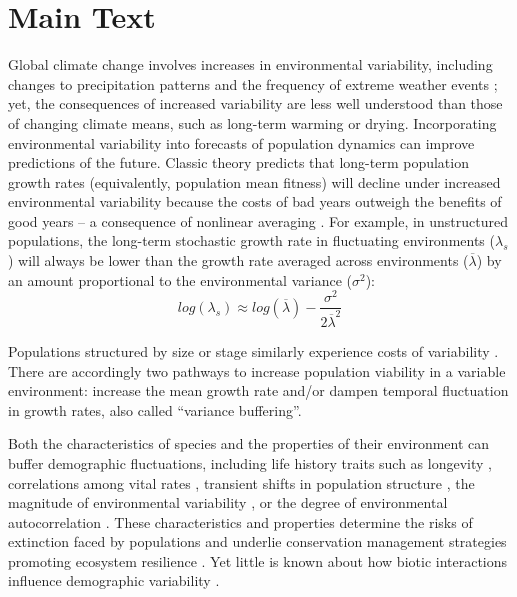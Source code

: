 \documentclass[12pt]{article}
\begin{document}
\section*{Main Text}

Global climate change involves increases in environmental variability, including changes to precipitation patterns and the frequency of extreme weather events \cite{IPCC2012managing,seneviratne2012changes,stocker2013technical};
yet, the consequences of increased variability are less well understood than those of changing climate means, such as long-term warming or drying. 
Incorporating environmental variability into forecasts of population dynamics can improve predictions of the future.
Classic theory predicts that long-term population growth rates (equivalently, population mean fitness) will decline under increased environmental variability because the costs of bad years outweigh the benefits of good years -- a consequence of nonlinear averaging \cite{lewontin_population_1969,tuljapurkar_population_1982}.
For example, in unstructured populations, the long-term stochastic growth rate in fluctuating environments ($\lambda_s$) will always be lower than the growth rate averaged across environments ($\overline{\lambda}$) by an amount proportional to the environmental variance ($\sigma^2$): 
\begin{equation}
	 log(\lambda_s)  \approx log(\overline{\lambda}) - \frac{\sigma^2}{2\overline{\lambda}^2}
\end{equation}

\noindent Populations structured by size or stage similarly experience costs of variability \cite{cohen1979comparative,tuljapurkar2013population}.
There are accordingly two pathways to increase population viability in a variable environment: increase the mean growth rate and/or dampen temporal fluctuation in growth rates, also called ``variance buffering''.

Both the characteristics of species and the properties of their environment can buffer demographic fluctuations, including life history traits such as longevity \cite{pfister1998patterns, morris2008longevity}, correlations among vital rates \cite{compagnoni2016effect}, transient shifts in population structure \cite{ellis2013role}, the magnitude of environmental variability \cite{rodriguez2021limits}, or the degree of environmental autocorrelation \cite{tuljapurkar1980population,fieberg2001stochastic}. 
These characteristics and properties determine the risks of extinction faced by populations \cite{menges2000applications} and underlie conservation management strategies promoting ecosystem resilience \cite{kuparinen2016fishing}. 
Yet little is known about how biotic interactions influence demographic variability \cite{hilde_demographic_2020}. 
\end{document}
